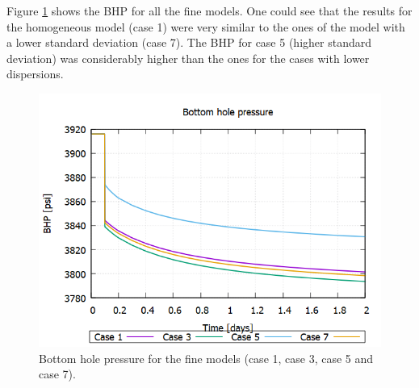 Figure \ref{fig:46} shows the BHP for all the fine models. One could see that the results for the homogeneous model (case 1) were very similar to the ones of the model with a lower standard deviation (case 7). The BHP for case 5 (higher standard deviation) was considerably higher than the ones for the cases with lower dispersions.

%
%
%
%
%

\begin{figure}[H]
	\centering
	\includegraphics[width=0.8\linewidth]{Images/46}
	\caption{Bottom hole pressure for the fine models (case 1, case 3, case 5 and case 7).}
	\label{fig:46}
\end{figure}

